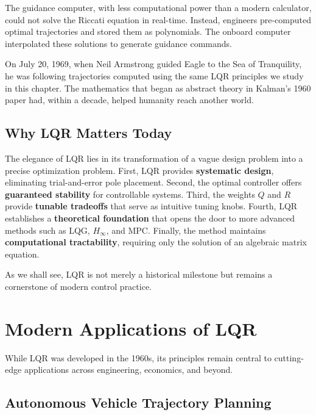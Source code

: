 The guidance computer, with less computational power than a modern calculator, could not solve the Riccati equation in real-time. Instead, engineers pre-computed optimal trajectories and stored them as polynomials. The onboard computer interpolated these solutions to generate guidance commands.

On July 20, 1969, when Neil Armstrong guided Eagle to the Sea of Tranquility, he was following trajectories computed using the same LQR principles we study in this chapter. The mathematics that began as abstract theory in Kalman's 1960 paper had, within a decade, helped humanity reach another world.

\subsection{Why LQR Matters Today}

The elegance of LQR lies in its transformation of a vague design problem into a precise optimization problem. First, LQR provides \textbf{systematic design}, eliminating trial-and-error pole placement. Second, the optimal controller offers \textbf{guaranteed stability} for controllable systems. Third, the weights $Q$ and $R$ provide \textbf{tunable tradeoffs} that serve as intuitive tuning knobs. Fourth, LQR establishes a \textbf{theoretical foundation} that opens the door to more advanced methods such as LQG, $H_\infty$, and MPC. Finally, the method maintains \textbf{computational tractability}, requiring only the solution of an algebraic matrix equation.

As we shall see, LQR is not merely a historical milestone but remains a cornerstone of modern control practice.


\section{Modern Applications of LQR}
\label{sec:lqr_applications}

While LQR was developed in the 1960s, its principles remain central to cutting-edge applications across engineering, economics, and beyond.

\subsection{Autonomous Vehicle Trajectory Planning}


